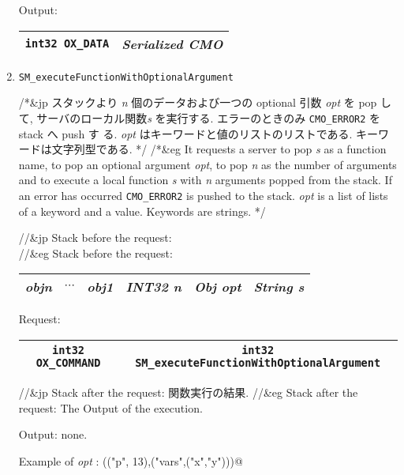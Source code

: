 \begin{enumerate}
Output:  
\begin{tabular}{|c|c|}  \hline
{\tt int32 OX\_DATA} &   {\it Serialized CMO} \\
\hline 
\end{tabular}


\item 
\begin{verbatim}
SM_executeFunctionWithOptionalArgument
\end{verbatim}
/*&jp
スタックより {\it n} 個のデータおよび一つの optional 引数 {\it opt} を pop して, 
サーバのローカル関数{\it s} を実行する.  エラーのときのみ {\tt CMO\_ERROR2} を stack へ push す
る.
{\it opt} はキーワードと値のリストのリストである. キーワードは文字列型である.
*/
/*&eg
It requests a server to pop {\it s} as a function name, 
to pop an optional argument {\it opt},
to pop {\it n} as the number of arguments and to execute
a local function {\it s} with {\it n} arguments popped from
the stack.
If an error has occurred {\tt CMO\_ERROR2} is pushed to the stack.
{\it opt} is a list of lists of a keyword and a value.
Keywords are strings.
*/

//&jp Stack before the request: \\
//&eg Stack before the request: \\
\begin{tabular}{|c|c|c|c|c|c|}  \hline
{\it objn} & $\cdots$ & {\it obj1} & {\it INT32 n} & {\it Obj opt} & {\it String s} \\
\hline 
\end{tabular}

Request:
\begin{tabular}{|c|c|}  \hline
{\tt int32 OX\_COMMAND} & {\tt int32 SM\_executeFunctionWithOptionalArgument}  \\
\hline
\end{tabular}

//&jp Stack after the request: 関数実行の結果.
//&eg Stack after the request: The Output of the execution.

Output: none.

\noindent
Example of {\it opt} : \verb@ (("p", 13),("vars",("x","y")))@

\noindent
[Added in 2004-3-8]

\end{enumerate}

